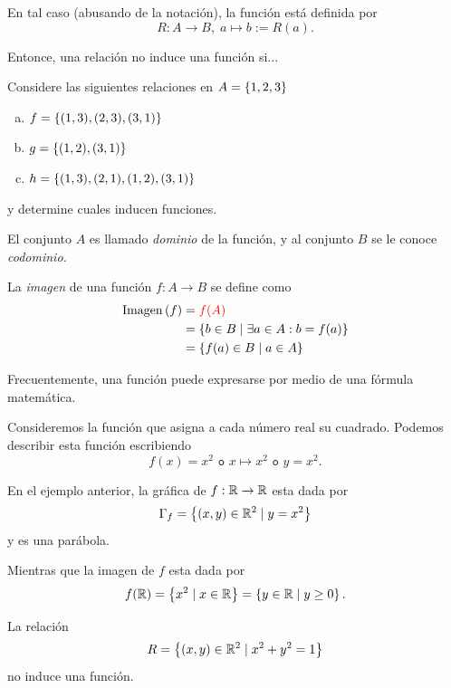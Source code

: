 	
	En tal caso (abusando de la notación), la función está definida por 
	$$
	R:A\to B, \; a \mapsto b:=R(a).
	$$



	Entonce, una relación no induce una función si...



	\begin{problema}
		Considere las siguientes relaciones en $A=\left\{ 1,2,3 \right\}$
		\begin{enumerate}[(a)]
			\item $f=\left\{ (1,3),(2,3),(3,1) \right\}$
			\item $g=\left\{ (1,2), (3,1) \right\}$
			\item $h=\left\{ (1,3),(2,1),(1,2),(3,1) \right\}$
		\end{enumerate}
		y determine cuales inducen funciones.
	\end{problema}
	




	El conjunto $A$ es llamado \emph{dominio} de la función, y al conjunto $B$ se le conoce \emph{codominio.}
	
	
	La \emph{imagen} de una función $f:A\to B$ se define como
	\begin{align*}
		\operatorname{Imagen}\left( f \right)&={\color{red} f(A)}\\
		&=\left\{ b \in B \mid \exists a \in A: b=f(a) \right\}\\
		&=\left\{ f(a)\in B \mid a \in A \right\}
	\end{align*}
	



	Frecuentemente, una función puede expresarse por medio de una fórmula matemática. 
	\begin{problema}
		Consideremos la función que asigna a cada número real su cuadrado. Podemos describir esta función escribiendo
		$$
		f(x)=x^{2} \texttt{ o } x\mapsto x^{2} \texttt{ o } y=x^{2}.
		$$
	\end{problema}



	En el ejemplo anterior, la gráfica de $f:\mathbb{R} \to \mathbb{R}$ esta dada por 
	$$
	\Gamma_{f}=\left\{ (x,y)\in \mathbb{R}^{2}\mid y=x^{2} \right\}
	$$ y es una parábola.
	
	
	Mientras que la imagen de $f$ esta dada por 
	$$
	f(\mathbb{R})=\left\{ x^{2}\mid x\in \mathbb{R} \right\}=\left\{ y\in \mathbb{R} \mid y\geq 0 \right\}.
	$$



	\begin{problema}
		La relación 
		$$
		R=\left\{ (x,y)\in \mathbb{R}^{2}\mid x^{2}+y^{2}=1 \right\}
		$$
		no induce una función.
	\end{problema}
	



